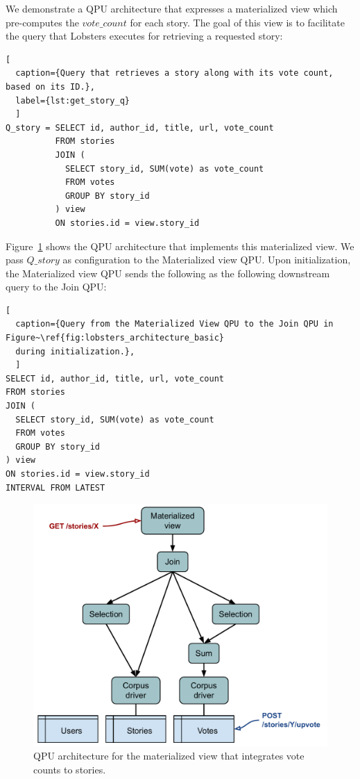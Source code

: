 \noindent
We demonstrate a QPU architecture that expresses a materialized view which pre-computes the $vote\_count$ for each story.
The goal of this view is to facilitate the query that Lobsters executes for retrieving a requested story:

\begin{lstlisting}[
  caption={Query that retrieves a story along with its vote count, based on its ID.},
  label={lst:get_story_q}
  ]
Q_story = SELECT id, author_id, title, url, vote_count
          FROM stories
          JOIN (
            SELECT story_id, SUM(vote) as vote_count
            FROM votes
            GROUP BY story_id
          ) view
          ON stories.id = view.story_id
\end{lstlisting}

\noindent
Figure~\ref{fig:lobsters_architecture_basic} shows the QPU architecture that implements this materialized view.
We pass $Q\_story$ as configuration to the Materialized view QPU.
Upon initialization, the Materialized view QPU sends the following as the following downstream query to the Join QPU:


\begin{lstlisting}[
  caption={Query from the Materialized View QPU to the Join QPU in Figure~\ref{fig:lobsters_architecture_basic}
  during initialization.},
  ]
SELECT id, author_id, title, url, vote_count
FROM stories
JOIN (
  SELECT story_id, SUM(vote) as vote_count
  FROM votes
  GROUP BY story_id
) view
ON stories.id = view.story_id
INTERVAL FROM LATEST
\end{lstlisting}

\begin{figure}[t]
  \centering
    \includegraphics[scale=0.5]{./figures/case_studies/lobsters_architecture_basic.pdf}
  \caption{QPU architecture for the materialized view that integrates vote counts to stories.}
  \label{fig:lobsters_architecture_basic}
\end{figure}

